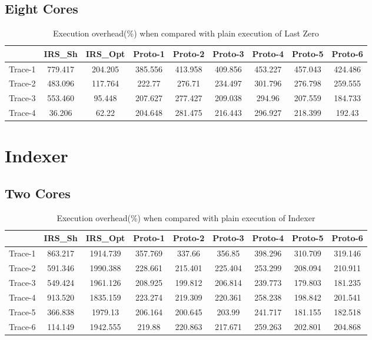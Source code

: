 \subsection{Eight Cores}
\begin{table}[h]
\begin{center}
 \begin{tabular}{|c c c c c c c c c|} 
 \hline
 & IRS\_Sh & IRS\_Opt& Proto-1 & Proto-2 & Proto-3 & Proto-4 & Proto-5 & Proto-6\\ %
 \hline
Trace-1 & 779.417 & 204.205 & 385.556 & 413.958 & 409.856 & 453.227 & 457.043 & 424.486\\
Trace-2 & 483.096 & 117.764 & 222.77 & 276.71 & 234.497 & 301.796 & 276.798 & 259.555\\
Trace-3 & 553.460 & 95.448 & 207.627 & 277.427 & 209.038 & 294.96 & 207.559 & 184.733\\
Trace-4 & 36.206 & 62.22 & 204.648 & 281.475 & 216.443 & 296.927 & 218.399 & 192.43\\
\hline
\end{tabular}
\end{center}
\caption{Execution overhead(\%) when compared with plain execution of Last Zero}
\label{last_zero_irs_res_cores_8}
\end{table}

\section{Indexer}

\subsection{Two Cores}
\begin{table}[h]
\begin{center}
 \begin{tabular}{|c c c c c c c c c|} 
 \hline
 & IRS\_Sh & IRS\_Opt& Proto-1 & Proto-2 & Proto-3 & Proto-4 & Proto-5 & Proto-6\\ %
 \hline
Trace-1 & 863.217 & 1914.739 & 357.769 & 337.66 & 356.85 & 398.296 & 310.709 & 319.146\\
Trace-2 & 591.346 & 1990.388 & 228.661 & 215.401 & 225.404 & 253.299 & 208.094 & 210.911\\
Trace-3 & 549.424 & 1961.126 & 208.925 & 199.812 & 206.814 & 239.773 & 179.803 & 181.235\\
Trace-4 & 913.520 & 1835.159 & 223.274 & 219.309 & 220.361 & 258.238 & 198.842 & 201.541\\
Trace-5 & 366.838 & 1979.13 & 206.164 & 200.645 & 203.99 & 241.717 & 181.155 & 182.518\\
Trace-6 & 114.149 & 1942.555 & 219.88 & 220.863 & 217.671 & 259.263 & 202.801 & 204.868\\
\hline
\end{tabular}
\end{center}
\caption{Execution overhead(\%) when compared with plain execution of Indexer}
\label{indexer_irs_res_cores_2}
\end{table}

